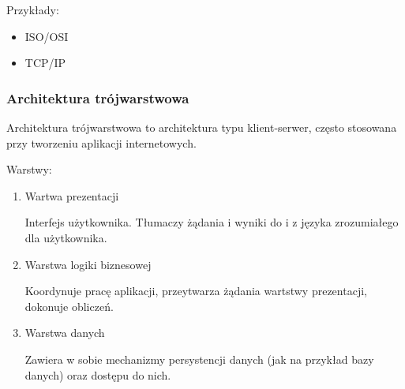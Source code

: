 \documentclass[12pt]{article}
\begin{document}
            Przykłady:
            \begin{itemize}
                \item ISO/OSI
                \item TCP/IP
            \end{itemize}

            \subsubsection{Architektura trójwarstwowa}

            Architektura trójwarstwowa to architektura typu klient-serwer,
            często stosowana przy tworzeniu aplikacji internetowych.

            Warstwy:
            \begin{enumerate}
                \item Wartwa prezentacji

                    Interfejs użytkownika. Tłumaczy żądania i wyniki
                    do i z języka zrozumiałego dla użytkownika.

                \item Warstwa logiki biznesowej

                    Koordynuje pracę aplikacji, przeytwarza żądania
                    wartstwy prezentacji, dokonuje obliczeń.

                \item Warstwa danych

                    Zawiera w sobie mechanizmy persystencji danych
                    (jak na przykład bazy danych) oraz dostępu do nich.
            \end{enumerate}
        
\end{document}
